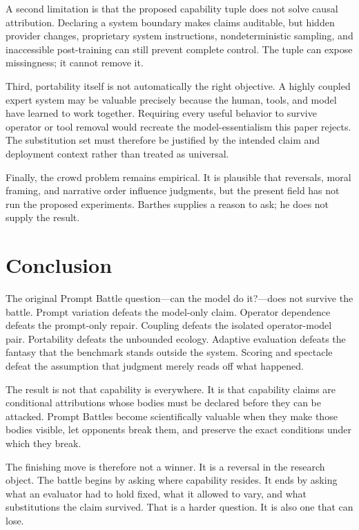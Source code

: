 \documentclass[11pt]{article}
\begin{document}
A second limitation is that the proposed capability tuple does not solve causal attribution. Declaring a system boundary makes claims auditable, but hidden provider changes, proprietary system instructions, nondeterministic sampling, and inaccessible post-training can still prevent complete control. The tuple can expose missingness; it cannot remove it.

Third, portability itself is not automatically the right objective. A highly coupled expert system may be valuable precisely because the human, tools, and model have learned to work together. Requiring every useful behavior to survive operator or tool removal would recreate the model-essentialism this paper rejects. The substitution set must therefore be justified by the intended claim and deployment context rather than treated as universal.

Finally, the crowd problem remains empirical. It is plausible that reversals, moral framing, and narrative order influence judgments, but the present field has not run the proposed experiments. Barthes supplies a reason to ask; he does not supply the result.

\section{Conclusion}
The original Prompt Battle question---can the model do it?---does not survive the battle. Prompt variation defeats the model-only claim. Operator dependence defeats the prompt-only repair. Coupling defeats the isolated operator-model pair. Portability defeats the unbounded ecology. Adaptive evaluation defeats the fantasy that the benchmark stands outside the system. Scoring and spectacle defeat the assumption that judgment merely reads off what happened.

The result is not that capability is everywhere. It is that capability claims are conditional attributions whose bodies must be declared before they can be attacked. Prompt Battles become scientifically valuable when they make those bodies visible, let opponents break them, and preserve the exact conditions under which they break.

The finishing move is therefore not a winner. It is a reversal in the research object. The battle begins by asking where capability resides. It ends by asking what an evaluator had to hold fixed, what it allowed to vary, and what substitutions the claim survived. That is a harder question. It is also one that can lose.
\end{document}
